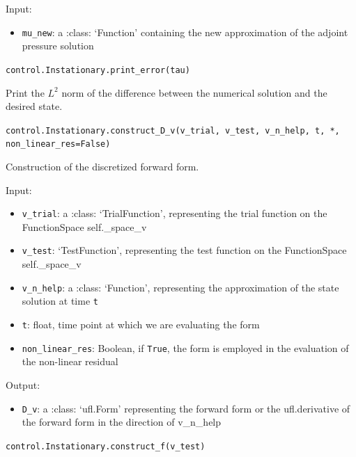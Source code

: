\documentclass[letterpaper,10pt,english]{sphinxmanual}
\begin{document}
Input:
\begin{itemize}
\item \texttt{mu{\_}new}: a :class: `Function' containing the new approximation
            of the adjoint pressure solution
\end{itemize}

\vspace{3ex}

\texttt{control.Instationary.print{\_}error(tau)}

Print the $L^2$ norm of the difference between the numerical solution and the desired state.

\vspace{3ex}

\texttt{control.Instationary.construct{\_}D{\_}v(v{\_}trial, v{\_}test, v{\_}n{\_}help, t, *, non{\_}linear{\_}res=False)}

Construction of the discretized forward form.

Input:
\begin{itemize}
\item \texttt{v{\_}trial}: a :class: `TrialFunction', representing the trial
            function on the FunctionSpace self.\_space\_v

\item \texttt{v{\_}test}: `TestFunction', representing the test
            function on the FunctionSpace self.\_space\_v

\item \texttt{v{\_}n{\_}help}: a :class: `Function', representing the approximation
            of the state solution at time \texttt{t}

\item \texttt{t}: float, time point at which we are evaluating the form

\item \texttt{non{\_}linear{\_}res}: Boolean, if \texttt{True}, the form is employed in the
            evaluation of the non-linear residual
\end{itemize}

Output:
\begin{itemize}
\item \texttt{D{\_}v}: a :class: `ufl.Form' representing the forward form or the
            ufl.derivative of the forward form in the direction of v\_n\_help
\end{itemize}

\vspace{3ex}

\texttt{control.Instationary.construct{\_}f(v{\_}test)}
\end{document}
